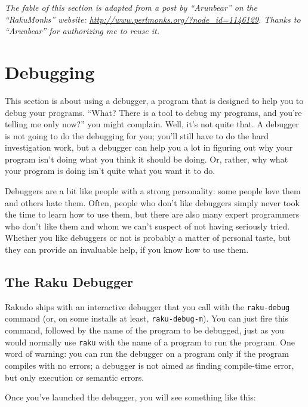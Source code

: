 \emph{The fable of this section is adapted 
from a post by ``Arunbear'' on the ``RakuMonks'' 
website: \url{http://www.perlmonks.org/?node_id=1146129}. 
Thanks to ``Arunbear'' for authorizing me 
to reuse it.}


\section{Debugging}
\label{raku-debugger}

This section is about using a debugger, a program that is 
designed to help you to debug your programs. ``What? There 
is a tool to debug my programs, and you're telling me only 
now?'' you might complain. Well, it's not quite that. A debugger 
is not going to do the debugging for you; you'll still have 
to do the hard investigation work, but a debugger can help 
you a lot in figuring out why your program isn't doing 
what you think it should be doing. Or, rather, why what your 
program is doing isn't quite what you want it to do.

Debuggers are a bit like people with a strong personality: 
some people love them and others hate them. Often, people 
who don't like debuggers simply never took the time to learn 
how to use them, but there are also many expert programmers 
who don't like them and whom we can't suspect of not having 
seriously tried. Whether you like debuggers or not is 
probably a matter of personal taste, but they can provide an 
invaluable help, if you know how to use them.

\subsection{The Raku Debugger}

Rakudo ships with an interactive debugger that 
you call with the {\tt raku-debug} command (or, on 
some installs at least, {\tt raku-debug-m}). You can 
just fire this command, followed by the name of the program 
to be debugged, just as you would normally use {\tt raku} with 
the name of a program to run the program. One word of 
warning: you can run the debugger on a program only if 
the program compiles with no errors; a debugger is not 
aimed as finding compile-time error, but only execution 
or semantic errors.

Once you've launched the debugger, you will see something 
like this:

